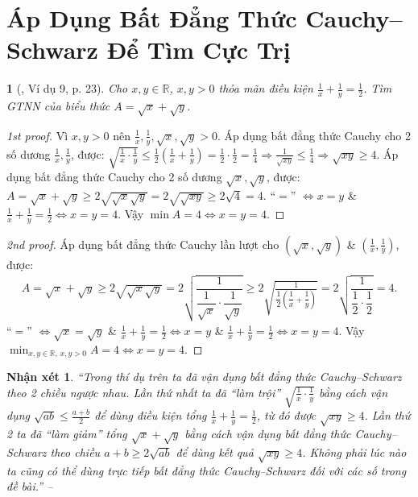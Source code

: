 \documentclass{article}
\newtheorem{baitoan}{}
\newtheorem{nhanxet}{Nhận xét}
\begin{document}

\section{Áp Dụng Bất Đẳng Thức Cauchy--Schwarz Để Tìm Cực Trị}

\begin{baitoan}[\cite{Tuyen_Toan_9_old}, Ví dụ 9, p. 23]
	Cho $x,y\in\mathbb{R}$, $x,y > 0$ thỏa mãn điều kiện $\frac{1}{x} + \frac{1}{y} = \frac{1}{2}$. Tìm {\rm GTNN} của biểu thức $A = \sqrt{x} + \sqrt{y}$.
\end{baitoan}

\begin{proof}[1st proof]
	Vì $x,y > 0$ nên $\frac{1}{x},\frac{1}{y},\sqrt{x},\sqrt{y} > 0$. Áp dụng bất đẳng thức Cauchy cho 2 số dương $\frac{1}{x},\frac{1}{y}$, được: $\sqrt{\frac{1}{x}\cdot\frac{1}{y}}\le\frac{1}{2}\left(\frac{1}{x} + \frac{1}{y}\right) = \frac{1}{2}\cdot\frac{1}{2} = \frac{1}{4}\Rightarrow\frac{1}{\sqrt{xy}}\le\frac{1}{4}\Rightarrow\sqrt{xy}\ge4$. Áp dụng bất đẳng thức Cauchy cho 2 số dương $\sqrt{x},\sqrt{y}$, được: $A = \sqrt{x} + \sqrt{y}\ge2\sqrt{\sqrt{x}\sqrt{y}} = 2\sqrt{\sqrt{xy}}\ge2\sqrt{4} = 4$. ``$=$'' $\Leftrightarrow x = y$ \& $\frac{1}{x} + \frac{1}{y} = \frac{1}{2}\Leftrightarrow x = y = 4$. Vậy $\min A = 4\Leftrightarrow x = y = 4$.
\end{proof}

\begin{proof}[2nd proof]
	Áp dụng bất đẳng thức Cauchy lần lượt cho $(\sqrt{x},\sqrt{y})$ \& $\left(\frac{1}{x},\frac{1}{y}\right)$, được:
	\begin{align*}
		A = \sqrt{x} + \sqrt{y}\ge2\sqrt{\sqrt{x}\sqrt{y}} = 2\sqrt{\dfrac{1}{\dfrac{1}{\sqrt{x}}\cdot\dfrac{1}{\sqrt{y}}}}\ge2\sqrt{\frac{1}{\dfrac{1}{2}\left(\dfrac{1}{x} + \dfrac{1}{y}\right)}} = 2\sqrt{\dfrac{1}{\dfrac{1}{2}\cdot\dfrac{1}{2}}} = 4.
	\end{align*}
	``$=$'' $\Leftrightarrow \sqrt{x} = \sqrt{y}$ \& $\frac{1}{x} + \frac{1}{y} = \frac{1}{2}\Leftrightarrow x = y$ \& $\frac{1}{x} + \frac{1}{y} = \frac{1}{2}\Leftrightarrow x = y = 4$. Vậy $\min_{x,y\in\mathbb{R},\,x,y > 0} A = 4\Leftrightarrow x = y = 4$.
\end{proof}

\begin{nhanxet}
	``Trong thí dụ trên ta đã vận dụng bất đẳng thức Cauchy--Schwarz theo 2 chiều ngược nhau. Lần thứ nhất ta đã ``làm trội'' $\sqrt{\frac{1}{x}\cdot\frac{1}{y}}$ bằng cách vận dụng $\sqrt{ab}\le\frac{a + b}{2}$ để dùng điều kiện tổng $\frac{1}{x} + \frac{1}{y} = \frac{1}{2}$, từ đó được $\sqrt{xy}\ge4$. Lần thứ 2 ta đã ``làm giảm'' tổng $\sqrt{x} + \sqrt{y}$ bằng cách vận dụng bất đẳng thức Cauchy--Schwarz theo chiều $a + b\ge2\sqrt{ab}$ để dùng kết quả $\sqrt{xy}\ge4$. Không phải lúc nào ta cũng có thể dùng trực tiếp bất đẳng thức Cauchy--Schwarz đối với các số trong đề bài.'' -- \emph{\cite[p. 24]{Tuyen_Toan_9_old}}
\end{nhanxet}
\end{document}
